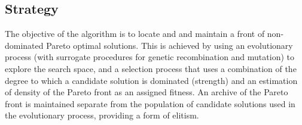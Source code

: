 \subsection{Strategy}
The objective of the algorithm is to locate and and maintain a front of non-dominated Pareto optimal solutions.
This is achieved by using an evolutionary process (with surrogate procedures for genetic recombination and mutation) to explore the search space, and a selection process that uses a combination of the degree to which a candidate solution is dominated (strength) and an estimation of density of the Pareto front as an assigned fitness. An archive of the Pareto front is maintained separate from the population of candidate solutions used in the evolutionary process, providing a form of elitism.

